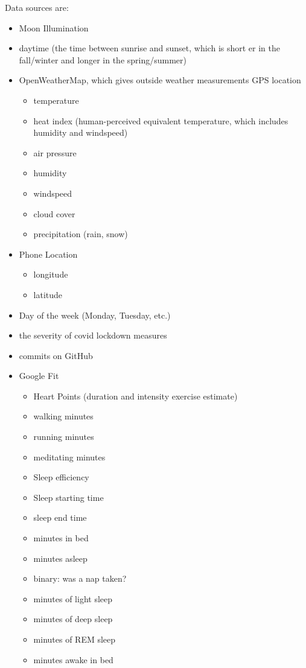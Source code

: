 \documentclass[conference]{IEEEtran}
\begin{document}
Data sources are:
\begin{itemize}
\item Moon Illumination
\item daytime (the time between sunrise and sunset, which is short er in the fall/winter and longer in the spring/summer)
\item OpenWeatherMap, which gives outside weather measurements GPS location 
   \begin{itemize}
\item temperature
\item heat index (human-perceived equivalent temperature, which includes humidity and windspeed)
\item air pressure
\item humidity
\item windspeed
\item cloud cover
\item precipitation (rain, snow)
\end{itemize}
\item Phone Location
   \begin{itemize}
\item longitude
\item latitude
\end{itemize}
\item Day of the week (Monday, Tuesday, etc.)
\item the severity of covid lockdown measures
\item commits on GitHub
\item Google Fit
   \begin{itemize}
\item Heart Points (duration and intensity exercise estimate)
\item walking minutes
\item running minutes
\item meditating minutes
\item Sleep efficiency
\item Sleep starting time
\item sleep end time
\item minutes in bed
\item minutes asleep
\item binary: was a nap taken?
\item minutes of light sleep
\item minutes of deep sleep
\item minutes of REM sleep
\item minutes awake in bed

\end{itemize}
\end{itemize}
\end{document}
